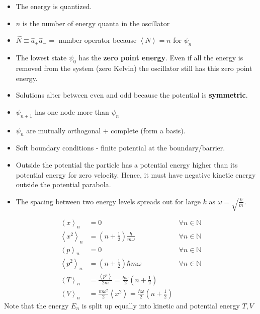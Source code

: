 \begin{itemize}
    \item The energy is quantized.
    \item $n$ is the number of energy quanta in the oscillator
    \item $\widehat{N} \equiv \widehat{a}_{+}\widehat{a}_{-} = $ number operator because $\left<N\right> = n$ for $\psi_n$
    \item The lowest state $\psi_0$ has the \textbf{zero point energy}. Even if all the energy is removed from the system (zero Kelvin) the oscillator still has this zero point energy.
    \item Solutions alter between even and odd because the potential is \textbf{symmetric}.
    \item $\psi_{n+1}$ has one node more than $\psi_n$
    \item $\psi_n$ are mutually orthogonal + complete (form a basis).
    \item Soft boundary conditions - finite potential at the boundary/barrier.
    \item Outside the potential the particle has a potential energy higher than its potential energy for zero velocity. Hence, it must have negative kinetic energy outside the potential parabola.
    \item The spacing between two energy levels spreads out for large $k$ as $\omega=\sqrt{\frac{k}{m}}$.
\end{itemize}

\noindent\begin{align*}
    \left\langle x \right\rangle _n   & = 0                                                                                                    & \forall n \in \mathbb{N} \\
    \left\langle x^2 \right\rangle _n & = \left(n+\frac{1}{2}\right)\frac{\hbar}{m\omega}                                                      & \forall n \in \mathbb{N} \\
    \left\langle p \right\rangle _n   & = 0                                                                                                    & \forall n \in \mathbb{N} \\
    \left\langle p^2 \right\rangle _n & = \left(n+\frac{1}{2}\right)\hbar m\omega                                                              & \forall n \in \mathbb{N} \\
    \left\langle T \right\rangle _n   & = \frac{\left\langle p^2 \right\rangle}{2m} =  \frac{\hbar \omega}{2}\left(n+\frac{1}{2}\right)                                   \\
    \left\langle V \right\rangle _n   & = \frac{m\omega^2}{2}\left\langle x^2 \right\rangle = \frac{\hbar \omega}{2}\left(n+\frac{1}{2}\right)
\end{align*}
Note that the energy $E_n$ is split up equally into kinetic and potential energy $T,V$

